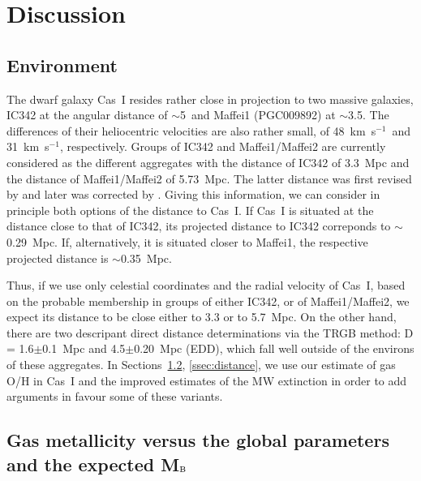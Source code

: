\documentclass[useAMS,usenatbib]{mn2e}
\newcommand{\kms}{km~s$^{-1}$}
\newcommand{\HI}{H{\sc i}}
\begin{document}
\section{Discussion}
\label{sec:discuss}


\subsection{Environment}
\label{ssec:environs}

The dwarf galaxy Cas~I resides rather close in projection to two massive galaxies,
IC342  at the angular distance of $\sim$5\degr\ and Maffei1 (PGC009892) at $\sim$3.5\degr.
The differences of their heliocentric                  %
velocities are also rather small, of 48~\kms\ and 31~\kms, respectively.
Groups of IC342 and Maffei1/Maffei2 are currently considered as the different aggregates
with the distance of IC342 of 3.3~Mpc \citep{Anand21} and the distance of Maffei1/Maffei2
of 5.73~Mpc. The latter distance was first revised by \citet{Tikhonov15} and later was
corrected by \citet{Anand19}.
Giving this information, we can consider in principle both options of the distance to Cas~I.
If Cas~I is situated at the distance close to that of IC342, its projected distance
to IC342  correponds to $\sim$0.29~Mpc. If, alternatively, it is situated closer to
Maffei1, the respective projected distance is $\sim$0.35~Mpc.

Thus, if we use only celestial coordinates and the radial velocity of Cas~I, based
on the probable membership in groups of either IC342, or of Maffei1/Maffei2,  we
expect its distance to be close either to 3.3 or to 5.7~Mpc. On the other hand,
there are two descripant direct distance determinations via the TRGB method:
D = 1.6$\pm$0.1~Mpc \citep{Tikhonov19} and 4.5$\pm$0.20~Mpc (EDD), which fall well
outside of the environs of these aggregates.
In Sections~\ref{ssec:O/H}, \ref{ssec:distance}, we use our estimate of gas O/H in Cas~I
and the improved estimates of the MW extinction in order to add arguments in favour
some of these variants.

\subsection{Gas metallicity versus the global parameters and the expected M$_{\rm B}$}
\label{ssec:O/H}
\end{document}
